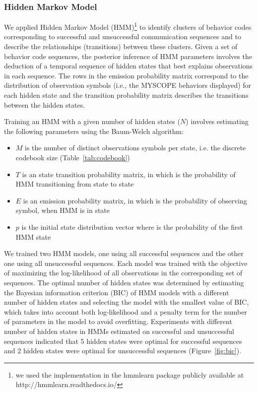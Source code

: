\subsubsection{Hidden Markov Model}
\label{subsubsec:hiddenMarkovModel}
We applied Hidden Markov Model (HMM)\footnote{we used the implementation in the hmmlearn package publicly available at http://hmmlearn.readthedocs.io/} to identify clusters of behavior codes corresponding to successful and unsuccessful communication sequences and to describe the relationships (transitions) between these clusters. Given a set of behavior code sequences, the posterior inference of HMM parameters involves the deduction of a temporal sequence of hidden states that best explains observations in each sequence. The rows in the emission probability matrix correspond to the distribution of observation symbols (i.e., the MYSCOPE behaviors displayed) for each hidden state and the transition probability matrix describes the transitions between the hidden states.

Training an HMM with a given number of hidden states ($N$) involves estimating the following parameters using the Baum-Welch algorithm:

\begin{itemize}
\item $M$ is the number of distinct observations symbols per state, i.e. the discrete codebook size (Table~\ref{tab:codebook})
\item $T$ is an state transition probability matrix, in which is the probability of HMM transitioning from state to state  
\item $E$ is an emission probability matrix, in which is the probability of observing symbol, when HMM is in state 
\item $p$ is the initial state distribution vector where is the probability of the first HMM state
\end{itemize}

We trained two HMM models, one using all successful sequences and the other one using all unsuccessful sequences. Each model was trained with the objective of maximizing the log-likelihood of all observations in the corresponding set of sequences. The optimal number of hidden states was determined by estimating the Bayesian information criterion (BIC) of HMM models with a different number of hidden states and selecting the model with the smallest value of BIC, which takes into account both log-likelihood and a penalty term for the number of parameters in the model to avoid overfitting. Experiments with different number of hidden states in HMMs estimated on successful and unsuccessful sequences indicated that 5 hidden states were optimal for successful sequences and 2 hidden states were optimal for unsuccessful sequences (Figure~\ref{fig:bic}). 

